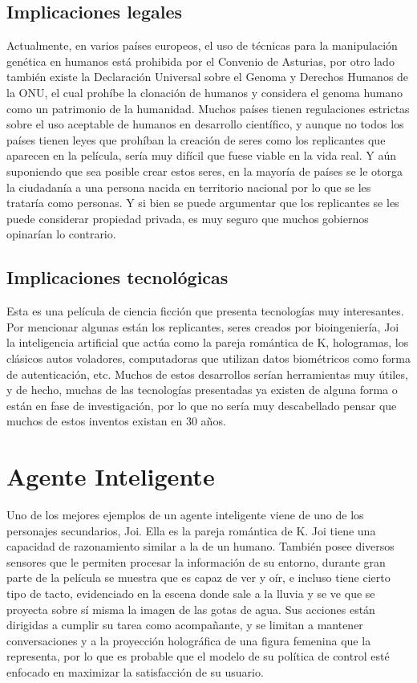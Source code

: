 \documentclass[]{scrreprt}
\begin{document}
\subsection{Implicaciones legales}
Actualmente, en varios países europeos, el uso de técnicas para la manipulación genética en humanos está prohibida por el Convenio de Asturias, por otro lado también existe la Declaración Universal sobre el Genoma y Derechos Humanos de la ONU, el cual prohíbe la clonación de humanos y considera el genoma humano como un patrimonio de la humanidad. Muchos países tienen regulaciones estrictas sobre el uso aceptable de humanos en desarrollo científico, y aunque no todos los países tienen leyes que prohíban la creación de seres como los replicantes que aparecen en la película, sería muy difícil que fuese viable en la vida real. Y aún suponiendo que sea posible crear estos seres, en la mayoría de países se le otorga la ciudadanía a una persona nacida en territorio nacional por lo que se les trataría como personas. Y si bien se puede argumentar que los replicantes se les puede considerar propiedad privada, es muy seguro que muchos gobiernos opinarían lo contrario.

\subsection{Implicaciones tecnológicas}
Esta es una película de ciencia ficción que presenta tecnologías muy interesantes. Por mencionar algunas están los replicantes, seres creados por bioingeniería, Joi la inteligencia artificial que actúa como la pareja romántica de K, hologramas, los clásicos autos voladores, computadoras que utilizan datos biométricos como forma de autenticación, etc. Muchos de estos desarrollos serían herramientas muy útiles, y de hecho, muchas de las tecnologías presentadas ya existen de alguna forma o están en fase de investigación, por lo que no sería muy descabellado pensar que muchos de estos inventos existan en 30 años.

\section{Agente Inteligente}
Uno de los mejores ejemplos de un agente inteligente viene de uno de los personajes secundarios, Joi. Ella es la pareja romántica de K. Joi tiene una capacidad de razonamiento similar a la de un humano. También posee diversos sensores que le permiten procesar la información de su entorno, durante gran parte de la película se muestra que es capaz de ver y oír, e incluso tiene cierto tipo de tacto, evidenciado en la escena donde sale a la lluvia y se ve que se proyecta sobre sí misma la imagen de las gotas de agua. Sus acciones están dirigidas a cumplir su tarea como acompañante, y se limitan a mantener conversaciones y a la proyección holográfica de una figura femenina que la representa, por lo que es probable que el modelo de su política de control esté enfocado en maximizar la satisfacción de su usuario. 
\end{document}
